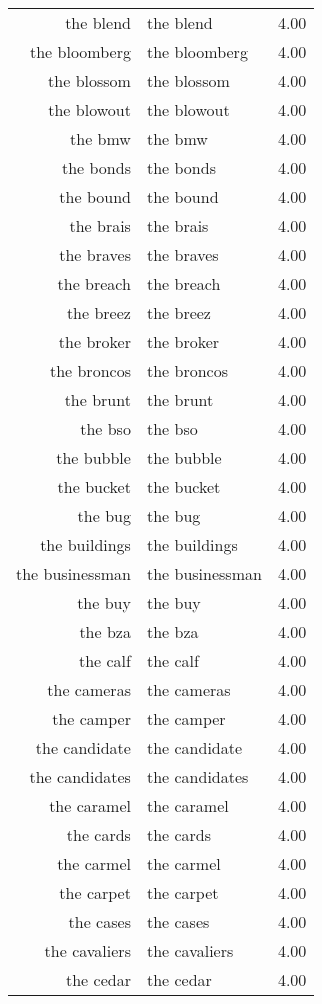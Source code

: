 \begin{table}[ht]
\begin{tabular}{rlr}
  the blend & the blend & 4.00 \\ 
  the bloomberg & the bloomberg & 4.00 \\ 
  the blossom & the blossom & 4.00 \\ 
  the blowout & the blowout & 4.00 \\ 
  the bmw & the bmw & 4.00 \\ 
  the bonds & the bonds & 4.00 \\ 
  the bound & the bound & 4.00 \\ 
  the brais & the brais & 4.00 \\ 
  the braves & the braves & 4.00 \\ 
  the breach & the breach & 4.00 \\ 
  the breez & the breez & 4.00 \\ 
  the broker & the broker & 4.00 \\ 
  the broncos & the broncos & 4.00 \\ 
  the brunt & the brunt & 4.00 \\ 
  the bso & the bso & 4.00 \\ 
  the bubble & the bubble & 4.00 \\ 
  the bucket & the bucket & 4.00 \\ 
  the bug & the bug & 4.00 \\ 
  the buildings & the buildings & 4.00 \\ 
  the businessman & the businessman & 4.00 \\ 
  the buy & the buy & 4.00 \\ 
  the bza & the bza & 4.00 \\ 
  the calf & the calf & 4.00 \\ 
  the cameras & the cameras & 4.00 \\ 
  the camper & the camper & 4.00 \\ 
  the candidate & the candidate & 4.00 \\ 
  the candidates & the candidates & 4.00 \\ 
  the caramel & the caramel & 4.00 \\ 
  the cards & the cards & 4.00 \\ 
  the carmel & the carmel & 4.00 \\ 
  the carpet & the carpet & 4.00 \\ 
  the cases & the cases & 4.00 \\ 
  the cavaliers & the cavaliers & 4.00 \\ 
  the cedar & the cedar & 4.00 \\ 

\end{tabular}
\end{table}
